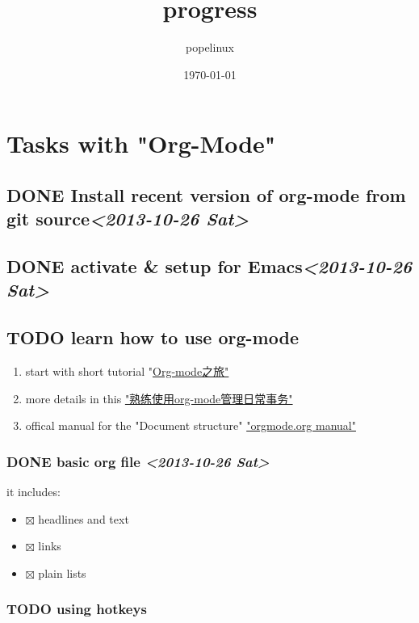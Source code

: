 \documentclass[11pt]{article}
\author{popelinux}
\date{\today}
\title{progress}
\begin{document}
\maketitle
\tableofcontents

\section{Tasks with "Org-Mode"}
\label{sec-1}
\subsection{{\bfseries\sffamily DONE} Install recent version of org-mode from git source\textit{<2013-10-26 Sat>}}
\label{sec-1-1}
\subsection{{\bfseries\sffamily DONE} activate \& setup for Emacs\textit{<2013-10-26 Sat>}}
\label{sec-1-2}
\subsection{{\bfseries\sffamily TODO} learn how to use org-mode}
\label{sec-1-3}
\begin{enumerate}
\item start with short tutorial "\href{http://www.yifeiyang.net/emacs/org-mode-tutorial.html}{Org-mode之旅" }
\item more details in this \href{http://helloxxxxxx.blog.163.com/blog/static/216015095201352772820142/}{"熟练使用org-mode管理日常事务"}
\item offical manual for the "Document structure" \href{http://orgmode.org/manual/Document-Structure.html#Document-Structure}{"orgmode.org manual"}
\end{enumerate}

\subsubsection{{\bfseries\sffamily DONE} basic org file \textit{<2013-10-26 Sat>}}
\label{sec-1-3-1}
it includes:
\begin{itemize}
\item $\boxtimes$ headlines and text
\item $\boxtimes$ links
\item $\boxtimes$ plain lists
\end{itemize}

\subsubsection{{\bfseries\sffamily TODO} using hotkeys}
\label{sec-1-3-2}
\end{document}
